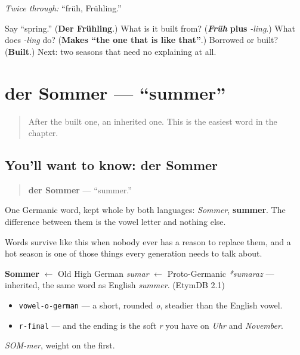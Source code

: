 \emph{Twice through:} \textquotedblleft{}früh, Frühling.\textquotedblright{}

\begin{tcolorbox}[breakable,colback=teal!4,colframe=teal!35!black,title={Before you move on}]
Say \textquotedblleft{}spring.\textquotedblright{} (\textbf{Der Frühling}.) What is it built from? (\emph{\textbf{Früh}} \textbf{plus} \emph{-ling}.) What does \emph{-ling} do? (\textbf{Makes \textquotedblleft{}the one that is like that\textquotedblright{}}.) Borrowed or built? (\textbf{Built}.) Next: two seasons that need no explaining at all.
\end{tcolorbox}
\section[der Sommer]{der Sommer — \textquotedblleft{}summer\textquotedblright{}}

\label{lesson:GE-C09-sommer}



\begin{quote}
After the built one, an inherited one. This is the easiest word in the chapter.
\end{quote}

\subsection*{You'll want to know: der Sommer}
\begin{quote}
\textbf{der Sommer} — \textquotedblleft{}summer.\textquotedblright{}
\end{quote}

One Germanic word, kept whole by both languages: \emph{Sommer}, \textbf{summer}. The difference between them is the vowel letter and nothing else.

Words survive like this when nobody ever has a reason to replace them, and a hot season is one of those things every generation needs to talk about.

\begin{cousinweb}
\textbf{Sommer} $\leftarrow$ Old High German \emph{sumar} $\leftarrow$ Proto-Germanic \emph{*sumaraz} — inherited, the same word as English \emph{summer}. (EtymDB 2.1)
\end{cousinweb}

\begin{sounds}
\begin{itemize}
\raggedright
  \item \texttt{vowel-o-german} — a short, rounded \emph{o}, steadier than the English vowel.
  \item \texttt{r-final} — and the ending is the soft \emph{r} you have on \emph{Uhr} and \emph{November}.
\end{itemize}

\emph{SOM-mer}, weight on the first.
\end{sounds}

